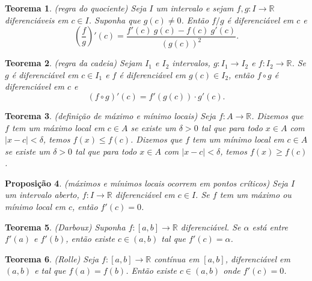 \documentclass[12pt]{article}
\theoremstyle{plain}
\newtheorem{thm}{Teorema}[section]
\newtheorem{prop}[thm]{Proposição}
\theoremstyle{definition}
\theoremstyle{remark}
\begin{document}
\begin{thm} (regra do quociente)
    Seja \(I\) um intervalo e sejam \(f, g : I \to \mathbb{R}\) diferenciáveis em \(c \in I\). Suponha que \(g(c) \neq 0\). Então \(f/g\) é diferenciável em \(c\) e
    \begin{equation}
        \left(\frac{f}{g}\right)'\left(c\right) = \frac{f'(c)\ g(c) - f(c)\ g'(c)}{(g(c))^2}.
    \end{equation}
\end{thm}

\begin{thm} (regra da cadeia)
    Sejam \(I_1\) e \(I_2\) intervalos, \(g : I_1 \to I_2\) e \(f : I_2 \to \mathbb{R}\). Se \(g\) é diferenciável em \(c \in I_1\) e \(f\) é diferenciável em \(g(c) \in I_2\), então \(f \circ g\) é diferenciável em \(c\) e
    \begin{equation}
        (f \circ g)'(c) = f'(g(c)) \cdot g'(c).
    \end{equation}
\end{thm}

\begin{thm} (definição de máximo e mínimo locais)
    Seja \(f : A \to \mathbb{R}\). Dizemos que \(f\) tem um \emph{máximo local} em \(c \in A\) se existe um \(\delta > 0\) tal que para todo \(x \in A\) com \(|x - c| < \delta\), temos \(f(x) \leq f(c)\). Dizemos que \(f\) tem um \emph{mínimo local} em \(c \in A\) se existe um \(\delta > 0\) tal que para todo \(x \in A\) com \(|x - c| < \delta\), temos \(f(x) \geq f(c)\).
\end{thm}

\begin{prop} (máximos e mínimos locais ocorrem em pontos críticos)
    Seja \(I\) um intervalo aberto, \(f : I \to \mathbb{R}\) diferenciável em \(c \in I\). Se \(f\) tem um máximo ou mínimo local em \(c\), então \(f'(c) = 0\).
\end{prop}

\begin{thm} (Darboux)
    Suponha \(f : [a, b] \to \mathbb{R}\) diferenciável. Se \(\alpha\) está entre \(f'(a)\) e \(f'(b)\), então existe \(c \in (a, b)\) tal que \(f'(c) = \alpha\).
\end{thm}

\begin{thm} (Rolle)
    Seja \(f : [a, b] \to \mathbb{R}\) contínua em \([a, b]\), diferenciável em \((a, b)\) e tal que \(f(a) = f(b)\). Então existe \(c \in (a, b)\) onde \(f'(c) = 0\).
\end{thm}
\end{document}
